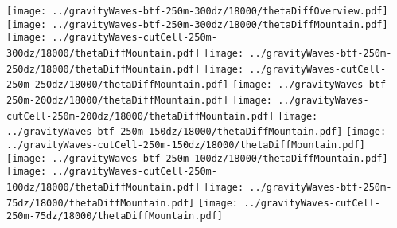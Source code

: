 \documentclass{article}
\begin{document}
\centering
\texttt{[image: ../gravityWaves-btf-250m-300dz/18000/thetaDiffOverview.pdf]}
\vspace*{0.1in}
\texttt{[image: ../gravityWaves-btf-250m-300dz/18000/thetaDiffMountain.pdf]}
\texttt{[image: ../gravityWaves-cutCell-250m-300dz/18000/thetaDiffMountain.pdf]}
\vspace*{0.1in}
\texttt{[image: ../gravityWaves-btf-250m-250dz/18000/thetaDiffMountain.pdf]}
\texttt{[image: ../gravityWaves-cutCell-250m-250dz/18000/thetaDiffMountain.pdf]}
\vspace*{0.1in}
\texttt{[image: ../gravityWaves-btf-250m-200dz/18000/thetaDiffMountain.pdf]}
\texttt{[image: ../gravityWaves-cutCell-250m-200dz/18000/thetaDiffMountain.pdf]}
\vspace*{0.1in}
\texttt{[image: ../gravityWaves-btf-250m-150dz/18000/thetaDiffMountain.pdf]}
\texttt{[image: ../gravityWaves-cutCell-250m-150dz/18000/thetaDiffMountain.pdf]}
\vspace*{0.1in}
\texttt{[image: ../gravityWaves-btf-250m-100dz/18000/thetaDiffMountain.pdf]}
\texttt{[image: ../gravityWaves-cutCell-250m-100dz/18000/thetaDiffMountain.pdf]}
\vspace*{0.1in}
\texttt{[image: ../gravityWaves-btf-250m-75dz/18000/thetaDiffMountain.pdf]}
\texttt{[image: ../gravityWaves-cutCell-250m-75dz/18000/thetaDiffMountain.pdf]}
\end{document}
